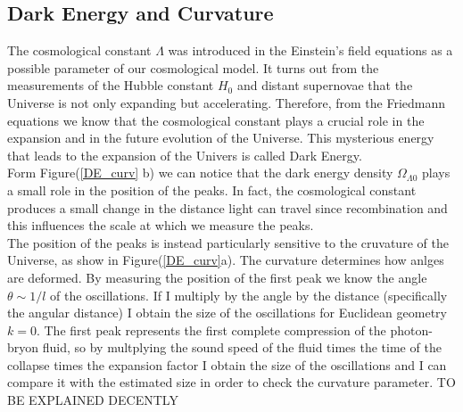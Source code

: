 \documentclass{article}
\begin{document}
\subsection{Dark Energy and Curvature}
The cosmological constant $\Lambda$ was introduced in the Einstein's field equations as a possible parameter of our cosmological model.
It turns out from the measurements of the Hubble constant $H_0$ and distant supernovae that the Universe is not only expanding but accelerating.
Therefore, from the Friedmann equations we know that the cosmological constant plays a crucial role in the expansion and in the future evolution of the Universe.
This mysterious energy that leads to the expansion of the Univers is called Dark Energy.\\
Form Figure(\ref{DE_curv} b) we can notice that the dark energy density $\Omega_{\Lambda0}$ plays a small role in the position of the peaks. 
In fact, the  cosmological constant produces a small change in the distance light can travel since recombination and this influences the scale at which we measure the peaks.\\
The position of the peaks is instead particularly sensitive to the cruvature of the Universe, as show in Figure(\ref{DE_curv}a).
The curvature determines how anlges are deformed.
By measuring the position of the first peak we know the angle $\theta \sim 1/l$ of the oscillations.
If I multiply by the angle by the distance (specifically the angular distance) I obtain the size of the oscillations for Euclidean geometry $k =0$.
The first peak represents the first complete compression of the photon-bryon fluid, so by multplying the sound speed of the fluid times the time of the collapse times the expansion factor I obtain the size of the oscillations and I can compare it with the estimated size in order to check the curvature parameter.
	TO BE EXPLAINED DECENTLY
\end{document}
